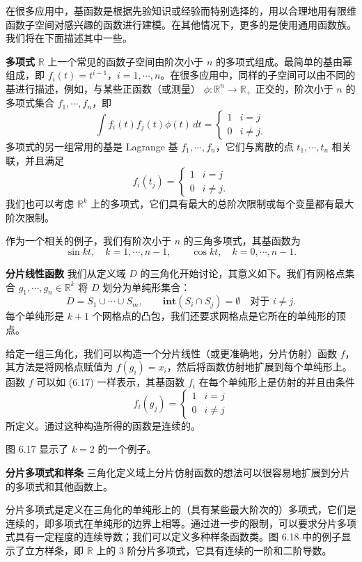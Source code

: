\documentclass[UTF8,12pt,a4paper,fontset=fandol]{ctexart}
\begin{document}
在很多应用中，基函数是根据先验知识或经验而特别选择的，用以合理地用有限维函数子空间对感兴趣的函数进行建模。在其他情况下，更多的是使用通用函数族。我们将在下面描述其中一些。

\noindent\textbf{多项式}\quad
$\mathbb{R}$ 上一个常见的函数子空间由阶次小于 $n$ 的多项式组成。最简单的基由幂组成，即 $f_i(t)=t^{i-1}$，$i=1,\cdots,n$。在很多应用中，同样的子空间可以由不同的基进行描述，例如，与某些正函数（或测量） $\phi:\mathbb{R}^n\to\mathbb{R}_+$ 正交的，阶次小于 $n$ 的多项式集合 $f_1,\cdots,f_n$，即
\[
\int f_i(t)f_j(t)\phi(t)\,dt=
\begin{cases}
1 & i=j\\
0 & i\neq j.
\end{cases}
\]
多项式的另一组常用的基是 Lagrange 基 $f_1,\cdots,f_n$，它们与离散的点 $t_1,\cdots,t_n$ 相关联，并且满足
\[
f_i(t_j)=
\begin{cases}
1 & i=j\\
0 & i\neq j.
\end{cases}
\]
我们也可以考虑 $\mathbb{R}^k$ 上的多项式，它们具有最大的总阶次限制或每个变量都有最大阶次限制。

作为一个相关的例子，我们有阶次小于 $n$ 的三角多项式，其基函数为
\[
\sin kt,\quad k=1,\cdots,n-1,\qquad \cos kt,\quad k=0,\cdots,n-1.
\]

\noindent\textbf{分片线性函数}\quad
我们从定义域 $D$ 的三角化开始讨论，其意义如下。我们有网格点集合 $g_1,\cdots,g_n\in\mathbb{R}^k$ 将 $D$ 划分为单纯形集合：
\[
D=S_1\cup\cdots\cup S_m,\qquad \mathbf{int}(S_i\cap S_j)=\emptyset \quad \text{对于 } i\neq j.
\]
每个单纯形是 $k+1$ 个网格点的凸包，我们还要求网格点是它所在的单纯形的顶点。

给定一组三角化，我们可以构造一个分片线性（或更准确地，分片仿射）函数 $f$，其方法是将网格点赋值为 $f(g_i)=x_i$，然后将函数仿射地扩展到每个单纯形上。函数 $f$ 可以如 (6.17) 一样表示，其基函数 $f_i$ 在每个单纯形上是仿射的并且由条件
\[
f_i(g_j)=
\begin{cases}
1 & i=j\\
0 & i\neq j
\end{cases}
\]
所定义。通过这种构造所得的函数是连续的。

图 6.17 显示了 $k=2$ 的一个例子。

\noindent\textbf{分片多项式和样条}\quad
三角化定义域上分片仿射函数的想法可以很容易地扩展到分片的多项式和其他函数上。

分片多项式是定义在三角化的单纯形上的（具有某些最大阶次的）多项式，它们是连续的，即多项式在单纯形的边界上相等。通过进一步的限制，可以要求分片多项式具有一定程度的连续导数；我们可以定义多种样条函数类。图 6.18 中的例子显示了立方样条，即 $\mathbb{R}$ 上的 3 阶分片多项式，它具有连续的一阶和二阶导数。
\end{document}
